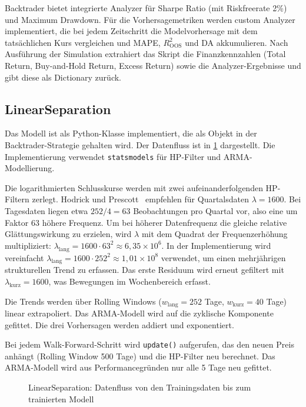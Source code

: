 Backtrader bietet integrierte Analyzer für Sharpe Ratio (mit Riskfreerate 2\%) und Maximum Drawdown. Für die Vorhersagemetriken werden custom Analyzer implementiert, die bei jedem Zeitschritt die Modelvorhersage mit dem tatsächlichen Kurs vergleichen und \ac{MAPE}, $R^2_{\text{OOS}}$ und \ac{DA} akkumulieren. Nach Ausführung der Simulation extrahiert das Skript die Finanzkennzahlen (Total Return, Buy-and-Hold Return, Excess Return) sowie die Analyzer-Ergebnisse und gibt diese als Dictionary zurück.

\subsection{LinearSeparation}\label{subsec:impl_linear_separation}
Das Modell ist als Python-Klasse implementiert, die als Objekt in der Backtrader-Strategie gehalten wird. Der Datenfluss ist in \cref{fig:linear_separation_datenfluss} dargestellt. Die Implementierung verwendet \texttt{statsmodels} für \ac{HP}-Filter und ARMA-Modellierung.

Die logarithmierten Schlusskurse werden mit zwei aufeinanderfolgenden \ac{HP}-Filtern zerlegt. Hodrick und Prescott~\cite{hodrick1997postwar} empfehlen für Quartalsdaten $\lambda = 1600$. Bei Tagesdaten liegen etwa $252/4 = 63$ Beobachtungen pro Quartal vor, also eine um Faktor 63 höhere Frequenz. Um bei höherer Datenfrequenz die gleiche relative Glättungswirkung zu erzielen, wird $\lambda$ mit dem Quadrat der Frequenzerhöhung multipliziert: $\lambda_{\text{lang}} = 1600 \cdot 63^2 \approx 6{,}35 \times 10^6$. In der Implementierung wird vereinfacht $\lambda_{\text{lang}} = 1600 \cdot 252^2 \approx 1{,}01 \times 10^8$ verwendet, um einen mehrjährigen strukturellen Trend zu erfassen. Das erste Residuum wird erneut gefiltert mit $\lambda_{\text{kurz}} = 1600$, was Bewegungen im Wochenbereich erfasst.

Die Trends werden über Rolling Windows ($w_{\text{lang}} = 252$ Tage, $w_{\text{kurz}} = 40$ Tage) linear extrapoliert. Das ARMA-Modell wird auf die zyklische Komponente gefittet. Die drei Vorhersagen werden addiert und exponentiert.

Bei jedem Walk-Forward-Schritt wird \texttt{update()} aufgerufen, das den neuen Preis anhängt (Rolling Window 500 Tage) und die \ac{HP}-Filter neu berechnet. Das \ac{ARMA}-Modell wird aus Performancegründen nur alle 5 Tage neu gefittet.

\begin{figure}[htbp]
    \centering
    
    \caption{LinearSeparation: Datenfluss von den Trainingsdaten bis zum trainierten Modell}\label{fig:linear_separation_datenfluss}
\end{figure}

